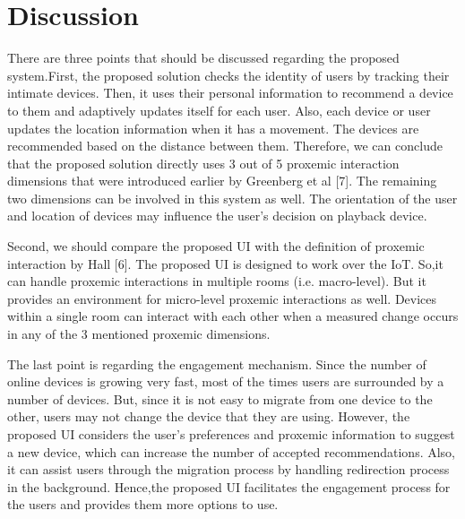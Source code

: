\documentclass{article}
\begin{document}
\section{Discussion}
There are three points that should be discussed regarding the proposed system.First, the proposed solution checks the identity of users by tracking their intimate devices. Then, it uses their personal information to recommend a device to them and adaptively updates itself for each user. Also, each device or user updates the location information when it has a movement. The devices are recommended based on the distance between them. Therefore, we can conclude that the proposed solution directly uses 3 out of 5 proxemic interaction dimensions that were introduced earlier by Greenberg et al [7]. The remaining two dimensions can be involved in this system as well. The orientation of the user and location of devices may influence the user's decision on playback device.

Second, we should compare the proposed UI with the definition of proxemic
interaction by Hall [6]. The proposed UI is designed to work over the IoT. So,it can handle proxemic interactions in multiple rooms (i.e. macro-level). But it provides an environment for micro-level proxemic interactions as well. Devices within a single room can interact with each other when a measured change occurs in any of the 3 mentioned proxemic dimensions.

The last point is regarding the engagement mechanism. Since the number
of online devices is growing very fast, most of the times users are surrounded by a number of devices. But, since it is not easy to migrate from one device to the other, users may not change the device that they are using. However, the proposed UI considers the user's preferences and proxemic information to suggest a new device, which can increase the number of accepted recommendations. Also, it can assist users through the migration process by handling redirection process in the background. Hence,the proposed UI facilitates the engagement process for the users and provides them more options to use.
\end{document}
